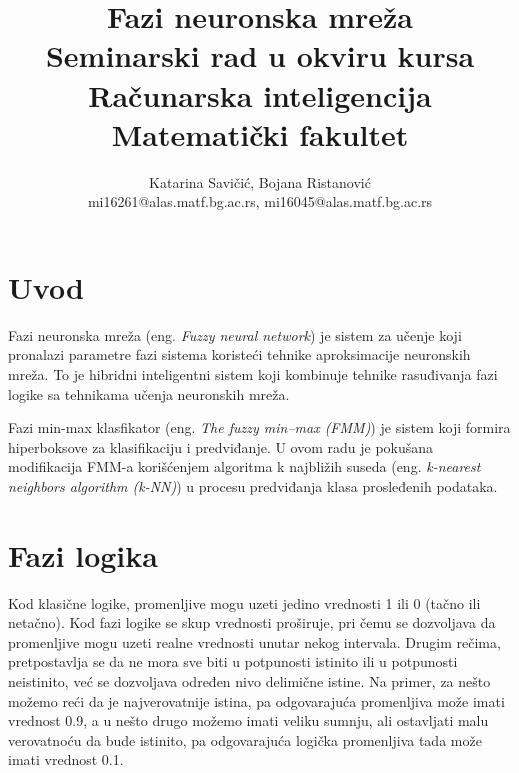 \documentclass[a4paper]{article}
\begin{document}
\title{Fazi neuronska mreža\\ \small{Seminarski rad u okviru kursa\\Računarska inteligencija\\ Matematički fakultet}}

\author{Katarina Savičić, Bojana Ristanović\\ mi16261@alas.matf.bg.ac.rs, mi16045@alas.matf.bg.ac.rs}

\maketitle

\tableofcontents

\newpage

\section{Uvod}
\label{sec:uvod}

Fazi neuronska mreža (eng. \emph{Fuzzy neural network}) je sistem za učenje koji pronalazi parametre fazi sistema koristeći tehnike aproksimacije neuronskih mreža. To je hibridni inteligentni sistem koji kombinuje tehnike rasuđivanja fazi logike sa tehnikama učenja neuronskih mreža.\cite{fnn}

Fazi min-max klasfikator (eng. \emph{The fuzzy min–max (FMM)}) je sistem koji formira hiperboksove za klasifikaciju i predviđanje. U ovom radu je pokušana modifikacija FMM-a korišćenjem algoritma k najbližih suseda (eng. \emph{k-nearest neighbors algorithm (k-NN)}) u procesu predviđanja klasa prosleđenih podataka.

\section{Fazi logika}
\label{fazilogika}
Kod klasične logike, promenljive mogu uzeti jedino vrednosti 1 ili 0 (tačno ili netačno). Kod fazi logike se skup vrednosti proširuje, pri čemu 
se dozvoljava da promenljive mogu uzeti realne vrednosti unutar nekog intervala. Drugim rečima, pretpostavlja se da ne mora sve biti u 
potpunosti istinito ili u potpunosti neistinito, već se dozvoljava određen nivo delimične istine. Na primer, za nešto možemo reći da je 
najverovatnije istina, pa odgovarajuća promenljiva može imati vrednost 0.9, a u nešto drugo možemo imati veliku sumnju, ali ostavljati 
malu verovatnoću da bude istinito, pa odgovarajuća logička promenljiva tada može imati vrednost 0.1. \cite{fl}
\end{document}
